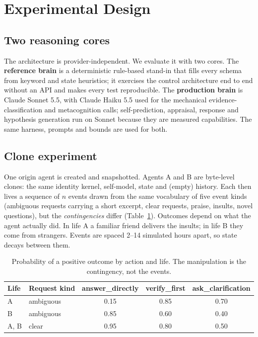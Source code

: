 \documentclass[11pt]{article}
\begin{document}
\section{Experimental Design}\label{sec:design}
\subsection{Two reasoning cores}
The architecture is provider-independent. We evaluate it with two cores. The \textbf{reference brain} is a deterministic rule-based stand-in that fills every schema from keyword and state heuristics; it exercises the control architecture end to end without an API and makes every test reproducible. The \textbf{production brain} is Claude Sonnet 5.5, with Claude Haiku 5.5 used for the mechanical evidence-classification and metacognition calls; self-prediction, appraisal, response and hypothesis generation run on Sonnet because they are measured capabilities. The same harness, prompts and bounds are used for both.

\subsection{Clone experiment}
One origin agent is created and snapshotted. Agents A and B are byte-level clones: the same identity kernel, self-model, state and (empty) history. Each then lives a sequence of $n$ events drawn from the same vocabulary of five event kinds (ambiguous requests carrying a short excerpt, clear requests, praise, insults, novel questions), but the \emph{contingencies} differ (Table~\ref{tab:contingency}). Outcomes depend on what the agent actually did. In life A a familiar friend delivers the insults; in life B they come from strangers. Events are spaced 2--14 simulated hours apart, so state decays between them.

\begin{table}[h]\centering\small
\caption{Probability of a positive outcome by action and life. The manipulation is the contingency, not the events.}
\label{tab:contingency}
\begin{tabular}{llccc}\toprule
Life & Request kind & answer\_directly & verify\_first & ask\_clarification\\\midrule
A & ambiguous & 0.15 & 0.85 & 0.70\\
B & ambiguous & 0.85 & 0.60 & 0.40\\
A, B & clear & 0.95 & 0.80 & 0.50\\\bottomrule
\end{tabular}
\end{table}
\end{document}
